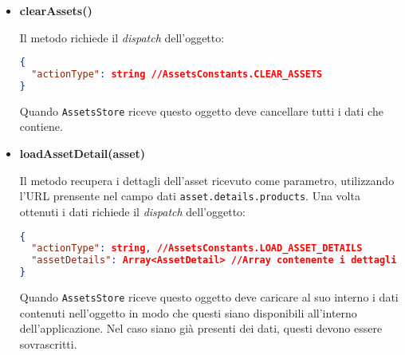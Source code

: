 \begin{itemize}
\item \textbf{clearAssets()}

Il metodo richiede il \textit{dispatch} dell'oggetto:
\begin{lstlisting}[language=JSON, caption=Action: clear assets]
{
  "actionType": string //AssetsConstants.CLEAR_ASSETS
}
\end{lstlisting}

Quando \texttt{AssetsStore} riceve questo oggetto deve cancellare tutti i dati che contiene.

\item \textbf{loadAssetDetail(asset)}

Il metodo recupera i dettagli dell'asset ricevuto come parametro, utilizzando l'URL prensente nel campo dati \texttt{asset.details.products}.
Una volta ottenuti i dati richiede il \textit{dispatch} dell'oggetto:

\begin{lstlisting}[language=JSON, caption=Action: load asset details]
{
  "actionType": string, //AssetsConstants.LOAD_ASSET_DETAILS
  "assetDetails": Array<AssetDetail> //Array contenente i dettagli dell'asset
}
\end{lstlisting}

Quando \texttt{AssetsStore} riceve questo oggetto deve caricare al suo interno i dati contenuti nell'oggetto in modo che questi siano disponibili all'interno dell'applicazione. Nel caso siano già presenti dei dati, questi devono essere sovrascritti.

\end{itemize}